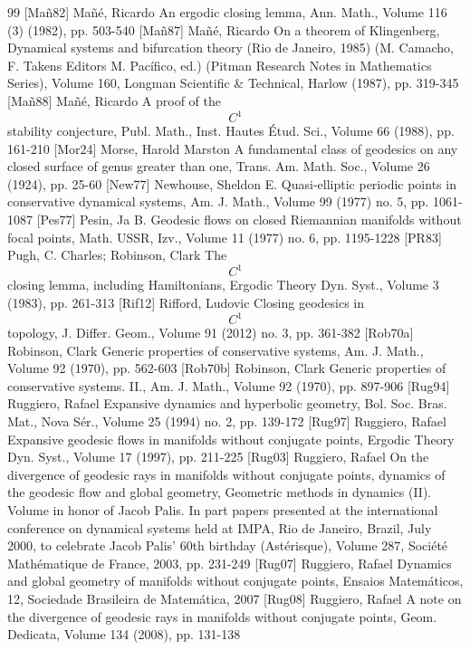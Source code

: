 \documentclass[10pt]{amsart}
\theoremstyle{definition}
\begin{document}
\begin{thebibliography}{99}
 [Mañ82] Mañé, Ricardo An ergodic closing lemma, Ann. Math., Volume 116 (3) (1982), pp. 503-540
 [Mañ87] Mañé, Ricardo On a theorem of Klingenberg, Dynamical systems and bifurcation theory (Rio de Janeiro, 1985) (M. Camacho, F. Takens Editors M. Pacífico, ed.) (Pitman Research Notes in Mathematics Series), Volume 160, Longman Scientific \& Technical, Harlow (1987), pp. 319-345
 [Mañ88] Mañé, Ricardo A proof of the $${C}^1$$ stability conjecture, Publ. Math., Inst. Hautes Étud. Sci., Volume 66 (1988), pp. 161-210
 [Mor24] Morse, Harold Marston A fundamental class of geodesics on any closed surface of genus greater than one, Trans. Am. Math. Soc., Volume 26 (1924), pp. 25-60
 [New77] Newhouse, Sheldon E. Quasi-elliptic periodic points in conservative dynamical systems, Am. J. Math., Volume 99 (1977) no. 5, pp. 1061-1087
 [Pes77] Pesin, Ja B. Geodesic flows on closed Riemannian manifolds without focal points, Math. USSR, Izv., Volume 11 (1977) no. 6, pp. 1195-1228
 [PR83] Pugh, C. Charles; Robinson, Clark The $${C}^{1}$$ closing lemma, including Hamiltonians, Ergodic Theory Dyn. Syst., Volume 3 (1983), pp. 261-313
 [Rif12] Rifford, Ludovic Closing geodesics in $${C}^{1}$$ topology, J. Differ. Geom., Volume 91 (2012) no. 3, pp. 361-382
 [Rob70a] Robinson, Clark Generic properties of conservative systems, Am. J. Math., Volume 92 (1970), pp. 562-603
 [Rob70b] Robinson, Clark Generic properties of conservative systems. II., Am. J. Math., Volume 92 (1970), pp. 897-906
 [Rug94] Ruggiero, Rafael Expansive dynamics and hyperbolic geometry, Bol. Soc. Bras. Mat., Nova Sér., Volume 25 (1994) no. 2, pp. 139-172
 [Rug97] Ruggiero, Rafael Expansive geodesic flows in manifolds without conjugate points, Ergodic Theory Dyn. Syst., Volume 17 (1997), pp. 211-225
 [Rug03] Ruggiero, Rafael On the divergence of geodesic rays in manifolds without conjugate points, dynamics of the geodesic flow and global geometry, Geometric methods in dynamics (II). Volume in honor of Jacob Palis. In part papers presented at the international conference on dynamical systems held at IMPA, Rio de Janeiro, Brazil, July 2000, to celebrate Jacob Palis’ 60th birthday (Astérisque), Volume 287, Société Mathématique de France, 2003, pp. 231-249
 [Rug07] Ruggiero, Rafael Dynamics and global geometry of manifolds without conjugate points, Ensaios Matemáticos, 12, Sociedade Brasileira de Matemática, 2007
 [Rug08] Ruggiero, Rafael A note on the divergence of geodesic rays in manifolds without conjugate points, Geom. Dedicata, Volume 134 (2008), pp. 131-138
\end{thebibliography}
\end{document}
